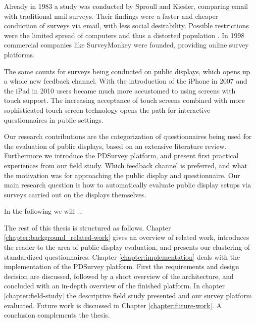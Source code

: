 	Already in 1983 a study was conducted by Sproull and Kiesler, comparing email with traditional mail surveys. Their findings were a faster and cheaper conduction of surveys via email, with less social desirability. Possible restrictions were the limited spread of computers and thus a distorted population \cite{sproull1986reducing}. In 1998 commercial companies like SurveyMonkey were founded, providing online survey platforms. 

	The same counts for surveys being conducted on public displays, which opens up a whole new feedback channel. With the introduction of the iPhone in 2007 and the iPad in 2010 users became much more accustomed to using screens with touch support. The increasing acceptance of touch screens combined with more sophisticated touch screen technology opens the path for interactive questionnaires in public settings.

	Our research contributions are the categorization of questionnaires being used for the evaluation of public displays, based on an extensive literature review. Furthermore we introduce the PDSurvey platform, and present first practical experiences from our field study. Which feedback channel is preferred, and what the motivation was for approaching the public display and questionnaire.
	Our main research question is how to automatically evaluate public display setups via surveys carried out on the displays themselves.


	In the following we will ... 
	
	The rest of this thesis is structured as follows. Chapter \ref{chapter:background_related-work} gives an overview of related work, introduces the reader to the area of public display evaluation, and presents our clustering of standardized questionnaires. Chapter \ref{chapter:implementation} deals with the implementation of the PDSurvey platform. First the requirements and design decision are discussed, followed by a short overview of the architecture, and concluded with an in-depth overview of the finished platform. In chapter \ref{chapter:field-study} the descriptive field study presented and our survey platform evaluated. Future work is discussed in Chapter \ref{chapter:future-work}. A conclusion complements the thesis.









